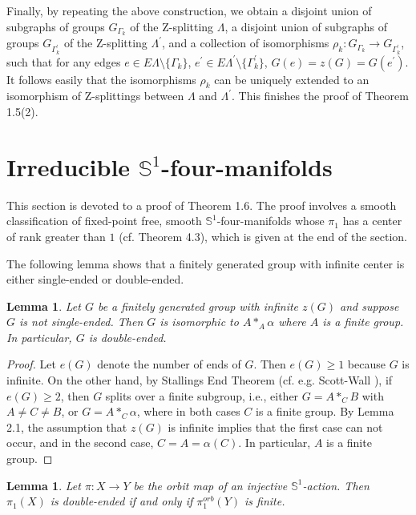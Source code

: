 \documentclass[11pt]{amsart}
\theoremstyle{plain}
\numberwithin{theorem}{section}
\newtheorem{lemma}[theorem]{Lemma}
\theoremstyle{definition}
\begin{document}
Finally, by repeating the above construction, we obtain a disjoint union of subgraphs of groups 
$G_{\Gamma_k}$ of the Z-splitting $\Lambda$, a disjoint union of subgraphs of groups 
$G_{\Gamma_k^\prime}$ of the Z-splitting $\Lambda^\prime$, and a collection of isomorphisms 
$\rho_k: G_{\Gamma_k}\rightarrow G_{\Gamma_k^\prime}$, such that for any edges $e\in E\Lambda
\setminus \{\Gamma_k\}$, $e^\prime\in E\Lambda^\prime\setminus \{\Gamma_k^\prime\}$, 
$G(e)=z(G)=G(e^\prime)$. It follows easily that the isomorphisms $\rho_k$ can be uniquely extended
to an isomorphism of Z-splittings between $\Lambda$ and $\Lambda^\prime$. 
This finishes the proof of Theorem 1.5(2). 

\section{Irreducible ${{\mathbb S}}^1$-four-manifolds}

This section is devoted to a proof of Theorem 1.6.  The proof involves a smooth classification of 
fixed-point free, smooth ${{\mathbb S}}^1$-four-manifolds whose $\pi_1$ has a center of rank greater than $1$ 
(cf. Theorem 4.3), which is given at the end of the section. 

The following lemma shows that a finitely generated group with infinite center is either single-ended or double-ended.

\begin{lemma}
Let $G$ be a finitely generated group with infinite $z(G)$ and suppose $G$ is not single-ended. Then 
$G$ is isomorphic to $A\ast_A \alpha$ where $A$ is a finite group. In particular, $G$ is double-ended.
\end{lemma}

\begin{proof}
Let $e(G)$ denote the number of ends of $G$. Then $e(G)\geq 1$ because $G$ is infinite. 
On the other hand, by Stallings End Theorem
(cf. e.g. Scott-Wall \cite{SW}), if $e(G)\geq 2$, then $G$ splits over a finite subgroup, i.e.,
either $G=A\ast_C B$ with $A\neq C\neq B$, or $G=A\ast_C\alpha$, where in both cases
$C$ is a finite group. By Lemma 2.1, the assumption that $z(G)$ is infinite implies
that the first case can not occur, and in the second case, $C=A=\alpha(C)$. In particular,
$A$ is a finite group.  

\end{proof}

\begin{lemma}
Let $\pi: X\rightarrow Y$ be the orbit map of an injective ${{\mathbb S}}^1$-action. Then $\pi_1(X)$ is 
double-ended if and only if $\pi_1^{orb}(Y)$ is finite. 
\end{lemma}
\end{document}
